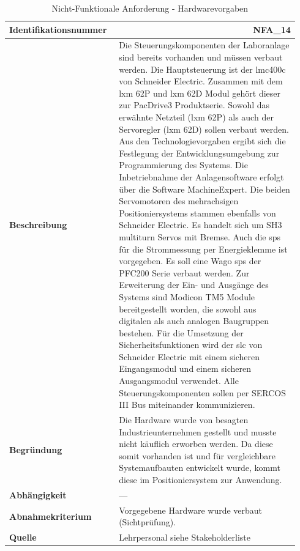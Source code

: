 \documentclass[../../../Bachelorarbeit.tex]{subfiles}
\begin{document}
\begin{table}[H]
    \centering
    \begin{tabular}{ p{0.34\linewidth}  p{0.6\linewidth} }
        \hline
        \textbf{Identifikationsnummer}  & \multicolumn{1}{r}{NFA\_14} \\ \hline
        \textbf{Beschreibung}           & Die Steuerungskomponenten der Laboranlage sind bereits vorhanden und müssen verbaut werden. Die Hauptsteuerung ist der \acs{lmc}400c von Schneider Electric. Zusammen mit dem \acs{lxm} 62P und \acs{lxm} 62D Modul gehört dieser zur PacDrive3 Produktserie. Sowohl das erwähnte Netzteil (\acs{lxm} 62P) als auch der Servoregler (\acs{lxm} 62D) sollen verbaut werden. Aus den Technologievorgaben ergibt sich die Festlegung der Entwicklungsumgebung zur Programmierung des Systems. Die Inbetriebnahme der Anlagensoftware erfolgt über die Software MachineExpert. Die beiden Servomotoren des mehrachsigen Positioniersystems stammen ebenfalls von Schneider Electric. Es handelt sich um SH3 multiturn Servos mit Bremse. Auch die \acs{sps} für die Strommessung per Energieklemme ist vorgegeben. Es soll eine Wago \acs{sps} der PFC200 Serie verbaut werden. Zur Erweiterung der Ein- und Ausgänge des Systems sind Modicon TM5 Module bereitgestellt worden, die sowohl aus digitalen als auch analogen Baugruppen bestehen. Für die Umsetzung der Sicherheitsfunktionen wird der \acs{slc} von Schneider Electric mit einem sicheren Eingangsmodul und einem sicheren Ausgangsmodul verwendet. Alle Steuerungskomponenten sollen per SERCOS III Bus miteinander kommunizieren. \\
        \textbf{Begründung}             & Die Hardware wurde von besagten Industrieunternehmen gestellt und musste nicht käuflich erworben werden. Da diese somit vorhanden ist und für vergleichbare Systemaufbauten entwickelt wurde, kommt diese im Positioniersystem zur Anwendung. \\
        \textbf{Abhängigkeit}           & --- \\
        \textbf{Abnahmekriterium}       & Vorgegebene Hardware wurde verbaut (Sichtprüfung). \\
        \textbf{Quelle}                 & Lehrpersonal siehe Stakeholderliste \\ \hline
    \end{tabular}
    \caption[\acs{nfa} - Hardwarevorgaben]{Nicht-Funktionale Anforderung - Hardwarevorgaben}
    \label{tab:my-table20}
\end{table}

\end{document}
